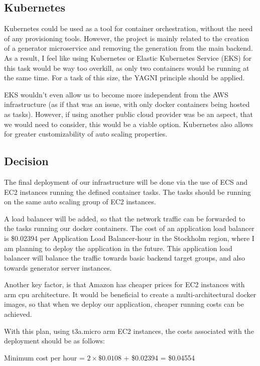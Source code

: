 	\subsection{Kubernetes}
		Kubernetes could be used as a tool for container orchestration, without the need of any provisioning tools. 
		However, the project is mainly related to the creation of a generator
		microservice and removing the generation from the main backend. As a result, I feel like using 
		Kubernetes or Elastic Kubernetes Service (EKS) for this task
		would be way too overkill, as only two containers would be running at the same time. 
		For a task of this size, the YAGNI principle should be applied.
		
		EKS wouldn't even allow us to become more independent
		from the AWS infrastructure (as if that was an issue, with only docker containers being hosted as tasks). However, if using another 
		public cloud provider was be an aspect, that we would need to consider, this would be a viable option. Kubernetes also allows for 
		greater customizability of auto scaling properties.

	\subsection{Decision} \label{awsdecision}
		The final deployment of our infrastructure will be done via the use of ECS and EC2 instances running the defined container tasks.
		The tasks should be running on the same auto scaling group of EC2 instances. 
		
		A load balancer will be added, so that the 
		network traffic can be forwarded to the tasks running our docker containers. The cost of an application load balancer is \$0.02394 per Application 
		Load Balancer-hour in the Stockholm region, where I am planning to deploy the application in the future. This application load balancer
		will balance the traffic towards basic backend target groups, and also towards generator server instances.

		Another key factor, is that Amazon has cheaper prices for EC2 instances with arm cpu architecture. It would be beneficial
		to create a multi-architectural docker images, so that when we deploy our application, cheaper running costs can be 
		achieved.

		With this plan, using t3a.micro arm EC2 instances, the costs associated with the deployment should be as follows:
		
		\begin{center}
			Minimum cost per hour = $2 \times \$0.0108$ + \$0.02394 = \$0.04554
		\end{center}

